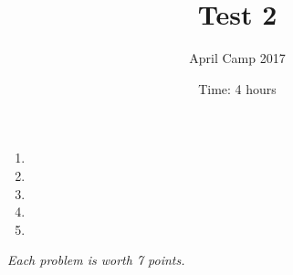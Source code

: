 \documentclass[a4paper,12pt]{article}
\title{Test 2}
\date{Time: 4 hours}
\author{April Camp 2017}
\begin{document}
 \maketitle

\begin{enumerate}
\item 
	
\item 

\item 

\item 

\item

\end{enumerate}

\medskip 

\hfill \emph{Each problem is worth 7 points.}
	
\end{document}
